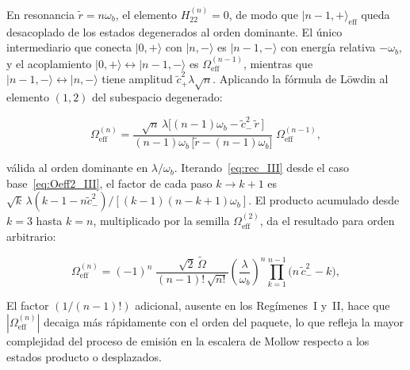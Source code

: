 En resonancia $\tilde{r} = n\omega_b$, el elemento $H^{(n)}_{22} = 0$, de modo que $|n-1,{+}\rangle_\mathrm{eff}$ queda desacoplado de los estados degenerados al orden dominante. El único intermediario que conecta $|0,{+}\rangle$ con $|n,{-}\rangle$ es $|n-1,{-}\rangle$ con energía relativa $-\omega_b$, y el acoplamiento $|0,{+}\rangle \leftrightarrow |n-1,{-}\rangle$ es $\Omega_\mathrm{eff}^{(n-1)}$, mientras que $|n-1,{-}\rangle \leftrightarrow |n,{-}\rangle$ tiene amplitud $\tilde{c}_+^2\lambda\sqrt{n}$. Aplicando la fórmula de Löwdin al elemento $(1,2)$ del subespacio degenerado:

\begin{equation}
	\Omega_\mathrm{eff}^{(n)}
	= \frac{\sqrt{n}\,\lambda\bigl[(n-1)\omega_b
		- \tilde{c}_-^2\,\tilde{r}\,\bigr]}
	{(n-1)\omega_b\,\bigl[\tilde{r} - (n-1)\omega_b\bigr]}
	\;\Omega_\mathrm{eff}^{(n-1)},
	\label{eq:rec_III}
\end{equation}

válida al orden dominante en $\lambda/\omega_b$. Iterando~\eqref{eq:rec_III} desde el caso base~\eqref{eq:Oeff2_III}, el factor de cada paso $k \to k+1$ es $\sqrt{k}\,\lambda(k-1 - n\tilde{c}_-^2)/[(k-1)(n-k+1)\omega_b]$. El producto acumulado desde $k=3$ hasta $k=n$, multiplicado por la semilla $\Omega_\mathrm{eff}^{(2)}$, da el resultado para orden arbitrario:

\begin{equation}
	\boxed{
		\Omega_\mathrm{eff}^{(n)}
		= (-1)^n\;\frac{\sqrt{2}\,\widetilde\Omega}
		{(n-1)!\,\sqrt{n!}}
		\left(\frac{\lambda}{\omega_b}\right)^{\!n}
		\prod_{k=1}^{n-1}\bigl(n\,\tilde{c}_-^2 - k\bigr),
	}
	\label{eq:resultado_III}
\end{equation}

El factor $(1/(n-1)!)$ adicional, ausente en los Regímenes~I y~II, hace que $|\Omega_\mathrm{eff}^{(n)}|$ decaiga más rápidamente con el orden del paquete, lo que refleja la mayor complejidad del proceso de emisión en la escalera de Mollow respecto a los estados producto o desplazados.